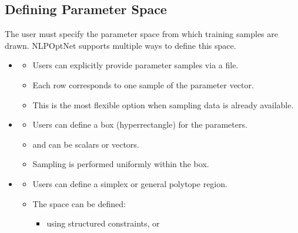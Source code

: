\documentclass[letterpaper,10pt,english,openany,oneside]{sphinxmanual}
\begin{document}
\subsection{Defining Parameter Space}
\label{\detokenize{user-guide/defining-parameter-space:defining-parameter-space}}\label{\detokenize{user-guide/defining-parameter-space::doc}}
\sphinxAtStartPar
The user must specify the parameter space from which training samples are drawn. NLPOpt\sphinxhyphen{}Net supports multiple ways to define this space.
\begin{itemize}
\item {} 
\sphinxAtStartPar
{}
\begin{itemize}
\item {} 
\sphinxAtStartPar
Users can explicitly provide parameter samples via a  file.

\item {} 
\sphinxAtStartPar
Each row corresponds to one sample of the parameter vector.

\item {} 
\sphinxAtStartPar
This is the most flexible option when sampling data is already available.

\end{itemize}

\item {} 
\sphinxAtStartPar
{}
\begin{itemize}
\item {} 
\sphinxAtStartPar
Users can define a box (hyper\sphinxhyphen{}rectangle) for the parameters.

\item {} 
\sphinxAtStartPar
{} and  can be scalars or vectors.

\item {} 
\sphinxAtStartPar
Sampling is performed uniformly within the box.

\end{itemize}

\item {} 
\sphinxAtStartPar
{}
\begin{itemize}
\item {} 
\sphinxAtStartPar
Users can define a simplex or general polytope region.

\item {} 
\sphinxAtStartPar
The space can be defined:
\begin{itemize}
\item {} 
\sphinxAtStartPar
using structured constraints, or


\end{itemize}
\end{itemize}
\end{itemize}
\end{document}
